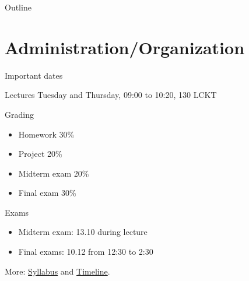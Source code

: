 \documentclass[\classoption]{beamer}
\title{\coursename}
\subtitle{Lecture 1: Introduction and Getting started}
\author{\tiny Patrick Diehl \orcid{}}
\date {
 \tiny \url{\courseurl}
\vspace{2cm}
\doclicenseThis  
  
}
\begin{document}
 {
    \frame {
        \titlepage
    }
}

\begin{frame}{Outline}


\tableofcontents

\end{frame}



\section{Administration/Organization}

\begin{frame}{Important dates}
\begin{block}{Lectures}
Tuesday and Thursday, 09:00 to 10:20, 130 LCKT
\end{block}

\begin{block}{Grading}
\begin{itemize}
\item Homework 30\%
\item Project 20\%
\item Midterm exam 20\%
\item  Final exam 30\%
\end{itemize}

\end{block}

\begin{block}{Exams}
\begin{itemize}
\item Midterm exam: 13.10 during lecture
\item Final exams: 10.12 from 12:30 to 2:30
\end{itemize}
\end{block}
\centering
More: \href{\coursesyllabus}{Syllabus} and \href{\coursetimeline}{Timeline}.
\end{frame}
\end{document}
